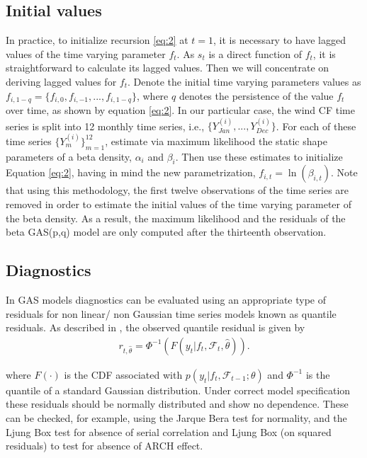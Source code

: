 \documentclass[a4paper]{IEEEtran}
\begin{document}
\subsection{Initial values}

In practice, to initialize recursion \eqref{eq:2} at $t=1$, it is necessary to have lagged values of the time varying parameter $f_{t}$. As $s_{t}$ is a direct function of $f_{t}$, it is straightforward to calculate its lagged values. Then we will concentrate on deriving lagged values for $f_{t}$. Denote the initial time varying parameters values as $f_{i,1-q}=\{f_{i,0},f_{i,-1},...,f_{i,1-q}\}$, where $q$ denotes the persistence of the value $f_{t}$ over time, as shown by equation \eqref{eq:2}. In our particular case, the wind CF time series is split into 12 monthly time series, i.e., $\{Y_{Jan}^{(i)},..., Y_{Dec}^{(i)}\}$. For each of these time series $\{Y_{m}^{(i)}\}_{m=1}^{12}$, estimate via maximum likelihood the static shape parameters of a beta density, $\alpha_{i}$ and $\beta_{i}$. Then use these estimates to initialize Equation \eqref{eq:2}, having in mind the new parametrization, $f_{i,t}=\ln(\beta_{i,t})$. Note that using this methodology, the first twelve observations of the time series are removed in order to estimate the initial values of the time varying parameter of the beta density. As a result, the maximum likelihood and the residuals of the beta GAS(p,q) model are only computed after the thirteenth observation.


\subsection{Diagnostics}

In GAS models diagnostics can be evaluated using an appropriate type of residuals for non linear/ non Gaussian time series models known as quantile residuals. As described in \cite{dunn1996randomized}, the observed quantile residual is given by
\begin{eqnarray} \label{residq}
r_{t,\hat{\theta}} = \Phi^{-1}(F(y_{t}|f_{t},\mathcal{F}_{t},\hat{\theta})).
\end{eqnarray} 
 
where $F(\cdot)$ is the CDF associated with $p(y_{t}|f_{t},\mathcal{F}_{t-1};\theta)$ and $\Phi^{-1}$ is the quantile of a standard Gaussian distribution. Under correct model specification these residuals should be normally distributed and show no dependence. These can be checked, for example, using the Jarque Bera test for normality, and the Ljung Box test for absence of serial correlation and Ljung Box (on squared residuals) to test for absence of ARCH effect. 
\end{document}
